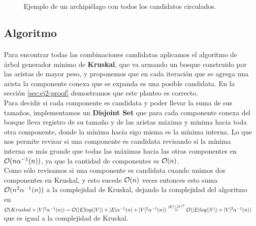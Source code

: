 \documentclass[../main.tex]{subfiles}
\begin{document}
\begin{figure}[H]
\centering

  
\caption{Ejemplo de un archipiélago con todos los candidatos circulados.}
\label{fig:ej2-ex}
\end{figure}

\subsection{Algoritmo}
\label{sec:ej2-algorithm}
\paragraph{} Para encontrar todas las combinaciones candidatas aplicamos el algoritmo de árbol generador mínimo de \textbf{Kruskal}, que va armando un bosque construido por las aristas de mayor peso, y proponemos que en cada iteración que se agrega una arista la componente conexa que se expanda es una posible candidata. En la sección \ref{sec:ej2-proof} demostramos que este planteo es correcto. \\
Para decidir si cada componente es candidata y poder llevar la suma de sus tamaños, implementamos un \textbf{Disjoint Set} que para cada componente conexa del bosque lleva registro de su tamaño y de las aristas máxima y mínima hacia toda otra componente, donde la mínima hacia sigo misma es la mínima interna. Lo que nos permite revisar si una componente es candidata revisando si la mínima interna es más grande que todas las máximas hacia las otras componentes en \(\mathcal{O}(n\alpha^{-1}(n))\), ya que la cantidad de componentes es \(\mathcal{O}(n)\). \\
Como sólo revisamos si una componente es candidata cuando unimos dos componentes en Kruskal, y esto sucede \(\mathcal{O}(n)\) veces entonces esto suma \(\mathcal{O}(n^{2}\alpha^{-1}(n))\) a la complejidad de Kruskal, dejando la complejidad del algoritmo en \(\mathcal{O}(Kruskal + |V|^{2}\alpha^{-1}(n)) = \mathcal{O}(|E|log(|V|) + |E|\alpha^{-1}(n) +|V|^{2}\alpha^{-1}(n)) \overset{|E| \leq |V|^{2}}{=} \mathcal{O}(|E|log(|V|) + |V|^{2}\alpha^{-1}(n))\) que es igual a la complejidad de Kruskal. %
\end{document}
